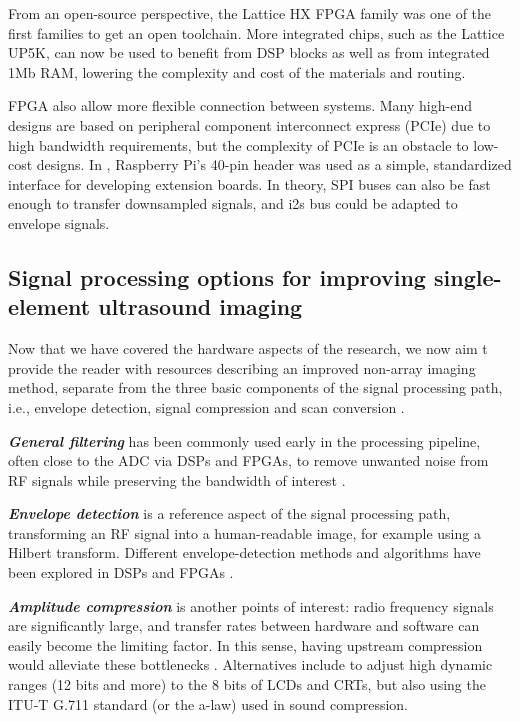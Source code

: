 \documentclass{article}
\begin{document}
From an open-source perspective, the Lattice HX FPGA family was one of the first families to get an open toolchain. More integrated chips, such as the Lattice UP5K, can now be used to benefit from DSP blocks as well as from integrated 1Mb RAM, lowering the complexity and cost of the materials and routing. 

FPGA also allow more flexible connection between systems. Many high-end designs are based on peripheral component interconnect express (PCIe) due to high bandwidth requirements\cite{zimmermann_high_2018, lewandowski_low-cost_2012, kidav_architecture_2019}, but the complexity of PCIe is an obstacle to low-cost designs. In \cite{luc_jonveaux_un0rick_2019}, Raspberry Pi's 40-pin header was used as a simple, standardized interface for developing extension boards. In theory, SPI buses can also be fast enough to transfer downsampled signals, and i2s bus could be adapted to envelope signals.

\subsection{Signal processing options for improving single-element ultrasound imaging}
 
Now that we have covered the hardware aspects of the research, we now aim t provide the reader with resources describing an improved non-array imaging method, separate from the three basic components of the signal processing path, i.e., envelope detection, signal compression and scan conversion \cite{basoglu_computing_1998}.

\textbf{\textit{General filtering}} has been commonly used early in the processing pipeline, often close to the ADC via DSPs and FPGAs, to remove unwanted noise from RF signals while preserving the bandwidth of interest \cite{assef_modeling_2019, levesque_real-time_2009}.

\textbf{\textit{Envelope detection}} is a reference aspect  of the signal processing path, transforming an RF signal into a human-readable image, for example using a Hilbert transform. Different envelope-detection methods and algorithms have been explored in DSPs and FPGAs \cite{chang_novel_2007, assef_fpga_2019, assef_modeling_2018}.

\textbf{\textit{Amplitude compression}} is another points of interest: radio frequency signals are significantly large, and transfer rates between hardware and software can easily become the limiting factor. In this sense, having upstream compression would alleviate these bottlenecks \cite{soto-cajiga_fpga-based_2012, akkala_fpga_2014}. Alternatives \cite{akkala_compression_2014, boonleelakul_compression_2013} include  to adjust high dynamic ranges (12 bits and more) to the 8 bits of LCDs and CRTs, but also using the ITU-T G.711 standard (or the a-law) used in sound compression.
\end{document}
